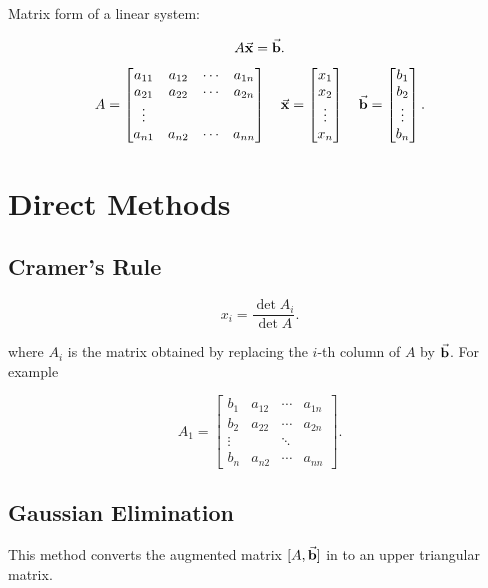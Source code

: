 \documentclass{report}
\begin{document}
Matrix form of a linear system:

\[
	A\vec{\bm{\mathrm{x}}} = \vec{\bm{\mathrm{b}}}
	.\]


\[
	A = \begin{bmatrix}
		a_{11} & a_{12} & \cdots & a_{1n} \\
		a_{21} & a_{22} & \cdots & a_{2n} \\
		\vdots &        &        &        \\
		a_{n1} & a_{n2} & \cdots & a_{nn}
	\end{bmatrix} \quad
	\vec{\bm{\mathrm{x}}} = \begin{bmatrix}
		x_1    \\
		x_2    \\
		\vdots \\
		x_n
	\end{bmatrix}\quad
	\vec{\bm{\mathrm{b}}} =\begin{bmatrix}
		b_1    \\
		b_2    \\
		\vdots \\
		b_n
	\end{bmatrix}
	.\]

\section{Direct Methods}

\subsection{Cramer's Rule}

\[
	x_i = \frac{\det A_i}{\det A}
	.\]

where $A_i$ is the matrix obtained by replacing the $i$-th column of $A$ by $\vec{\bm{\mathrm{b}}}$. For example

\[
	A_1 = \begin{bmatrix}
		b_1    & a_{12} & \cdots & a_{1n} \\
		b_2    & a_{22} & \cdots & a_{2n} \\
		\vdots &        & \ddots &        \\
		b_n    & a_{n2} & \cdots & a_{nn}
	\end{bmatrix}
	.\]

\subsection{Gaussian Elimination}

This method converts the augmented matrix $[A,\vec{\bm{\mathrm{b}}}]$ in to an upper triangular matrix.
\end{document}
